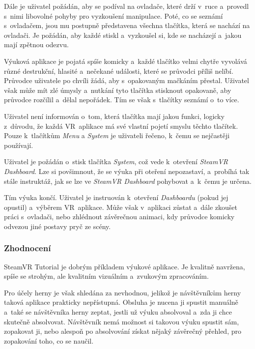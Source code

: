 Dále je uživatel požádán, aby se podíval na ovladače, které drží v~ruce
a~provedl s~nimi libovolné pohyby pro vyzkoušení manipulace.
Poté, co se seznámí s~ovladačem, jsou mu postupně představena
všechna tlačítka, která se nachází na ovladači. Je požádán, aby každé
stiskl a~vyzkoušel si, kde se nacházejí a~jakou mají zpětnou odezvu.

Výuková aplikace je pojatá spíše komicky a~každé tlačítko velmi chytře
vyvolává různé destrukční, hlasité a~nečekané události, které se
průvodci příliš nelíbí. Průvodce uživatele po chvíli žádá, aby s~opakovaným
mačkáním přestal. Uživatel však může mít zlé úmysly a~nutkání tyto tlačítka
stisknout opakovaně, aby průvodce rozčílil a~dělal nepořádek. Tím se
však s~tlačítky seznámí o~to více.

Uživatel není informován o~tom, která tlačítka mají jakou funkci, logicky
z~důvodu, že každá VR~aplikace má své vlastní pojetí smyslu těchto
tlačítek. Pouze k~tlačítkům \emph{Menu} a \emph{System} je uživateli
řečeno, k~čemu se nejčastěji používají.

Uživatel je požádán o~stisk tlačítka \emph{System}, což vede k~otevření
\emph{SteamVR Dashboard}. Lze si povšimnout, že se výuka při oteření
nepozastaví, a~probíhá tak stále instruktáž, jak se lze ve \emph{SteamVR
Dashboard} pohybovat a~k~čemu je určena.

Tím výuka končí. Uživatel je instruován k~otevření
\emph{Dashboardu} (pokud jej opustil) a~výběrem VR~aplikace. Může však
v~aplikaci zůstat a~dále zkoušet práci s~ovladači, nebo zhlédnout
závěrečnou animaci, kdy průvodce komicky odvezou jiné postavy pryč ze
scény.

\subsubsection{Zhodnocení}\label{zhodnocenuxed}

SteamVR Tutorial je dobrým příkladem výukové aplikace. Je kvalitně
navržena, spíše se strohým, ale kvalitním vizuálním a~zvukovým
zpracováním.

Pro účely herny je však shledána za nevhodnou, jelikož je návštěvníkům herny
taková aplikace prakticky nepřístupná. Obsluha je nucena ji spustit
manuálně a~také se návštěvníka herny zeptat, jestli už výuku absolvoval
a~zda ji chce skutečně absolvovat. Návštěvník nemá možnost si takovou
výuku spustit sám, zopakovat ji, nebo alespoň po absolvování získat
nějaký závěrečný přehled, pro zopakování toho, co se naučil.


